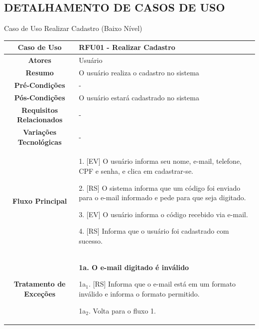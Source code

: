 \begin{apendicesenv}

    \newpage
    
    
    \chapter{DETALHAMENTO DE CASOS DE USO}
    

\begin{quadro}[htb]
	\centering
	\caption{\label{quadro_rfu01}Caso de Uso Realizar Cadastro (Baixo Nível)}
	\small
	\renewcommand{\arraystretch}{1.1}
	
	\begin{tabular}{|c|p{11cm}|}
		\hline
		\textbf{Caso de Uso} & RFU01 - Realizar Cadastro \\ \hline
		\textbf{Atores} & Usuário \\ \hline
		\textbf{Resumo} & O usuário realiza o cadastro no sistema \\ \hline
		\textbf{Pré-Condições} & - \\ \hline
		\textbf{Pós-Condições} & O usuário estará cadastrado no sistema \\ \hline
		\textbf{Requisitos Relacionados} & - \\ \hline
		\textbf{Variações Tecnológicas} & - \\ \hline
		
		\textbf{Fluxo Principal} &
		\parbox[t]{11cm}{
			\raggedright
			1. [EV] O usuário informa seu nome, e-mail, telefone, CPF e senha, e clica em cadastrar-se.\par
			2. [RS] O sistema informa que um código foi enviado para o e-mail informado e pede para que seja digitado.\par
			3. [EV] O usuário informa o código recebido via e-mail.\par
			4. [RS] Informa que o usuário foi cadastrado com sucesso.
		}
		\\ \hline
		
		\textbf{Tratamento de Exceções} &
		\parbox[t]{11cm}{
			\raggedright
			\textbf{1a. O e-mail digitado é inválido}\par
			1a$_1$. [RS] Informa que o e-mail está em um formato inválido e informa o formato permitido.\par
			1a$_2$. Volta para o fluxo 1.\par
			
}
\end{tabular}
\end{quadro}
\end{apendicesenv}

